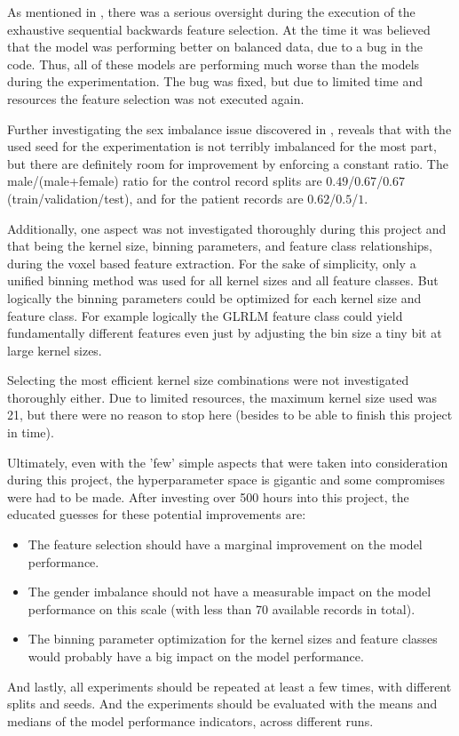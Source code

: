 As mentioned in , there was a serious oversight during the execution of the exhaustive sequential backwards feature selection. At the time it was believed that the model was performing better on balanced data, due to a bug in the code. Thus, all of these models are performing much worse than the models during the experimentation. The bug was fixed, but due to limited time and resources the feature selection was not executed again.\par
Further investigating the sex imbalance issue discovered in , reveals that with the used seed for the experimentation is not terribly imbalanced for the most part, but there are definitely room for improvement by enforcing a constant ratio. The male/(male+female) ratio for the control record splits are $0.49$/$0.67$/$0.67$ (train/validation/test), and for the patient records are $0.62$/$0.5$/$1$.\par
Additionally, one aspect was not investigated thoroughly during this project and that being the kernel size, binning parameters, and feature class relationships, during the voxel based feature extraction. For the sake of simplicity, only a unified binning method was used for all kernel sizes and all feature classes. But logically the binning parameters could be optimized for each kernel size and feature class. For example logically the \ac{GLRLM} feature class could yield fundamentally different features even just by adjusting the bin size a tiny bit at large kernel sizes.\par
Selecting the most efficient kernel size combinations were not investigated thoroughly either. Due to limited resources, the maximum kernel size used was 21, but there were no reason to stop here (besides to be able to finish this project in time).\par
Ultimately, even with the 'few' simple aspects that were taken into consideration during this project, the hyperparameter space is gigantic and some compromises were had to be made. After investing over 500 hours into this project, the educated guesses for these potential improvements are:
\begin{itemize}
  \item The feature selection should have a marginal improvement on the model performance.
  \item The gender imbalance should not have a measurable impact on the model performance on this scale (with less than 70 available records in total).
  \item The binning parameter optimization for the kernel sizes and feature classes would probably have a big impact on the model performance.
\end{itemize}
And lastly, all experiments should be repeated at least a few times, with different splits and seeds. And the experiments should be evaluated with the means and medians of the model performance indicators, across different runs.

